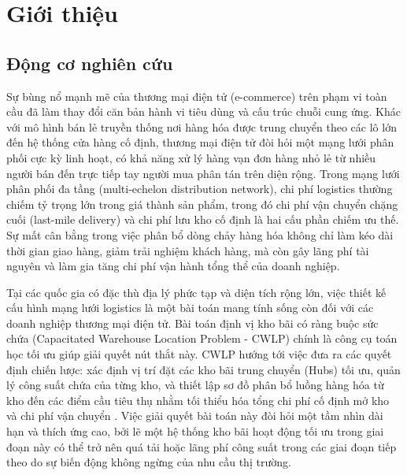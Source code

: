 \chapter{Giới thiệu}

\section{Động cơ nghiên cứu}

Sự bùng nổ mạnh mẽ của thương mại điện tử (e-commerce) trên phạm vi toàn cầu đã làm thay đổi căn bản hành vi tiêu dùng và cấu trúc chuỗi cung ứng. Khác với mô hình bán lẻ truyền thống nơi hàng hóa được trung chuyển theo các lô lớn đến hệ thống cửa hàng cố định, thương mại điện tử đòi hỏi một mạng lưới phân phối cực kỳ linh hoạt, có khả năng xử lý hàng vạn đơn hàng nhỏ lẻ từ nhiều người bán đến trực tiếp tay người mua phân tán trên diện rộng. Trong mạng lưới phân phối đa tầng (multi-echelon distribution network), chi phí logistics thường chiếm tỷ trọng lớn trong giá thành sản phẩm, trong đó chi phí vận chuyển chặng cuối (last-mile delivery) và chi phí lưu kho cố định là hai cấu phần chiếm ưu thế. Sự mất cân bằng trong việc phân bổ dòng chảy hàng hóa không chỉ làm kéo dài thời gian giao hàng, giảm trải nghiệm khách hàng, mà còn gây lãng phí tài nguyên và làm gia tăng chi phí vận hành tổng thể của doanh nghiệp.

Tại các quốc gia có đặc thù địa lý phức tạp và diện tích rộng lớn, việc thiết kế cấu hình mạng lưới logistics là một bài toán mang tính sống còn đối với các doanh nghiệp thương mại điện tử. Bài toán định vị kho bãi có ràng buộc sức chứa (Capacitated Warehouse Location Problem - CWLP) chính là công cụ toán học tối ưu giúp giải quyết nút thắt này. CWLP hướng tới việc đưa ra các quyết định chiến lược: xác định vị trí đặt các kho bãi trung chuyển (Hubs) tối ưu, quản lý công suất chứa của từng kho, và thiết lập sơ đồ phân bổ luồng hàng hóa từ kho đến các điểm cầu tiêu thụ nhằm tối thiểu hóa tổng chi phí cố định mở kho và chi phí vận chuyển \cite{milazzo2022, aardal1998}. Việc giải quyết bài toán này đòi hỏi một tầm nhìn dài hạn và thích ứng cao, bởi lẽ một hệ thống kho bãi hoạt động tối ưu trong giai đoạn này có thể trở nên quá tải hoặc lãng phí công suất trong các giai đoạn tiếp theo do sự biến động không ngừng của nhu cầu thị trường.

